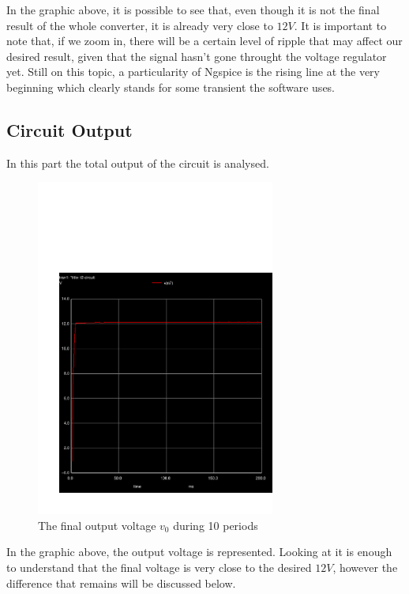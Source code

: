 In the graphic above, it is possible to see that, even though it is not the final result of the whole converter, it is already very close to $12V$. It is important to note that, if we zoom in, there will be a certain level of ripple that may affect our desired result, given that the signal hasn't gone throught the voltage regulator yet. Still on this topic, a particularity of Ngspice is the rising line at the very beginning which clearly stands for some transient the software uses.

\subsection{Circuit Output}

In this part the total output of the circuit is analysed.

\begin{figure}[H]\centering
\includegraphics[trim= 0cm 0cm 0cm 10cm, clip, width=0.7\textwidth]{trans2.pdf}
\caption{The final output voltage $v_0$ during 10 periods}
\label{fig:sim_output}
\end{figure}

In the graphic above, the output voltage is represented. Looking at it is enough to understand that the final voltage is very close to the desired $12V$, however the difference that remains will be discussed below.

